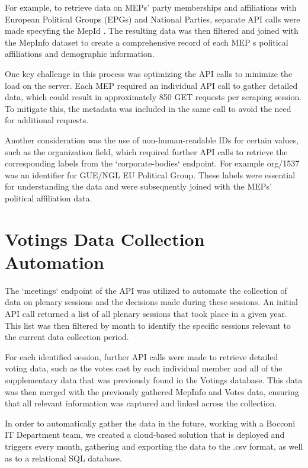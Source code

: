 \documentclass{report}
\begin{document}
    For example, to retrieve data on MEPs' party memberships and affiliations with European Political Groups
    (EPGs) and
    National Parties, separate API calls were made specyfing the MepId . The resulting data was then filtered
    and joined
    with the MepInfo dataset to create a comprehensive record of each MEP s political affiliations and
    demographic
    information.

    One key challenge in this process was optimizing the API calls to minimize the load on the server. Each MEP
    required
    an individual API call to gather detailed data, which could result in approximately 850 GET requests per
    scraping
    session. To mitigate this, the metadata was included in the same call to avoid the need for additional
    requests.

    Another consideration was the use of non-human-readable IDs for certain values, such as the organization
    field,
    which required further API calls to retrieve the corresponding labels from the `corporate-bodies` endpoint.
    For
    example org/1537 was an identifier for GUE/NGL EU Political Group. These labels were essential for
    understanding the
    data and were subsequently joined with the MEPs' political affiliation data.


    \section{Votings Data Collection Automation}

    The `meetings` endpoint of the API was utilized to automate the collection of data on plenary sessions and
    the
    decisions made during these sessions. An initial API call returned a list of all plenary sessions that took
    place in
    a given year. This list was then filtered by month to identify the specific sessions relevant to the current
    data
    collection period.

    For each identified session, further API calls were made to retrieve detailed voting data, such as the votes
    cast by
    each individual member and all of the supplementary data that was previously found in the Votings database.
    This
    data was then merged with the previously gathered MepInfo and Votes data, ensuring that all relevant
    information was
    captured and linked across the collection.

    In order to automatically gather the data in the future, working with a Bocconi IT Department team, we
    created a
    cloud-based solution that is deployed and triggers every month, gathering and exporting the data to the .csv
    format,
    as well as to a relational SQL database.
\end{document}
